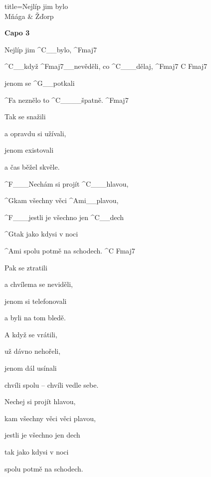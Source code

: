 \begin{song}{title=\predtitle\centering Nejlíp jim bylo \\\large Mňága \& Žďorp  \vspace*{-0.3cm}}  %
\begin{centerjustified}

\begin{center}\textbf{Capo 3}\end{center}

\sloka 
	Nejlíp jim ^{C{\color{white}\_\_}}bylo, ^{Fmaj7}
	
	^{C{\color{white}\_\_}}když ^{Fmaj7{\color{white}\_\_}}nevěděli, co ^{C{\color{white}\_\_\_}}dělaj, ^{Fmaj7\,\,C\,\,Fmaj7}
	
	jenom se ^{G{\color{white}\_\_}}potkali 

	^{F}a neznělo to ^{C{\color{white}\_\_\_\_}}špatně. ^{Fmaj7} 

\sloka
	Tak se snažili 
	
	a opravdu si užívali,
	
	jenom existovali 
	
	a čas běžel skvěle.

	^{F{\color{white}\_\_\_}}Nechám si projít ^{C{\color{white}\_\_\_}}hlavou,
	
	^{G}kam všechny věci ^{Ami{\color{white}\_\_}}plavou,
	
	^{F{\color{white}\_\_\_}}jestli je všechno jen ^{C{\color{white}\_\_}}dech

	^{G}tak jako kdysi v noci 

	^{Ami\,\,}spolu potmě na schodech. ^{C\,\,Fmaj7}

\sloka
	Pak se ztratili 

	a chvílema se neviděli,

	jenom si telefonovali 

	a byli na tom bledě.

\sloka
	A když se vrátili,
	
	už dávno nehořeli,

	jenom dál usínali

	chvíli spolu -- chvíli vedle sebe.


	Nechej si projít hlavou,
	
	kam všechny věci věci plavou,
	
	jestli je všechno jen dech
	
	tak jako kdysi v noci 

	spolu potmě na schodech.


\end{centerjustified}
\setcounter{Slokočet}{0}
\end{song}
